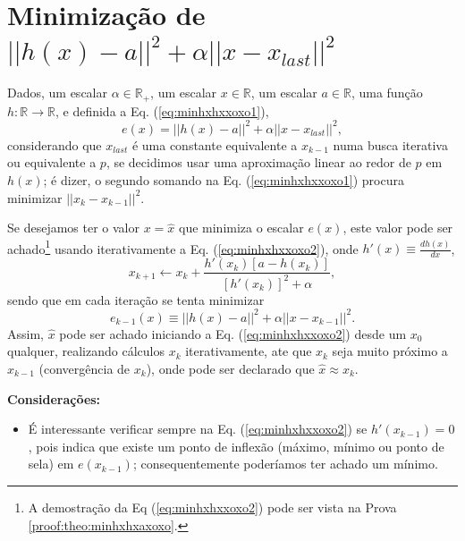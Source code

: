 \section{Minimização de $||h(x)-a||^2+\alpha ||x-x_{last}||^2$}


\begin{theorem}\label{theo:minhxhxxoxo}
Dados,
um escalar $\alpha \in \mathbb{R}_+$, 
um escalar $x \in \mathbb{R}$, 
um escalar $a \in \mathbb{R}$,  
uma função $h:\mathbb{R} \rightarrow \mathbb{R}$, e 
definida a Eq. (\ref{eq:minhxhxxoxo1}),
\begin{equation}\label{eq:minhxhxxoxo1}
e(x)=||h(x)-a||^2+\alpha ||x-x_{last}||^2,
\end{equation}
considerando que $x_{last}$ é uma constante equivalente a $x_{k-1}$
numa busca iterativa ou equivalente a $p$, 
se decidimos usar uma aproximação linear ao redor de $p$ em $h(x)$; 
é dizer, o segundo somando na Eq. (\ref{eq:minhxhxxoxo1}) 
procura minimizar $||x_{k}-x_{k-1}||^2$.

Se desejamos ter o valor $x=\hat{x}$ que minimiza o escalar $e(x)$,
este valor pode ser achado\footnote{A 
demostração da Eq (\ref{eq:minhxhxxoxo2}) pode ser vista na Prova \ref{proof:theo:minhxhxaxoxo}.} 
 usando iterativamente a Eq. (\ref{eq:minhxhxxoxo2}),
onde  $h'(x)\equiv \frac{d h(x)}{d x}$,
\begin{equation}\label{eq:minhxhxxoxo2}
x_{k+1} \leftarrow x_k+
\frac{ h'(x_k) \left[a-h(x_k)\right] }{\left[h'(x_k)\right]^2+\alpha},
\end{equation}
sendo que em cada iteração se tenta minimizar
\begin{equation}\label{eq:minhxhxxoxo2:ex}
e_{k-1}(x)  \equiv ||h(x)-a||^2 + \alpha||x-x_{k-1}||^2.
\end{equation}
Assim, $\hat{x}$ pode ser achado iniciando a Eq. (\ref{eq:minhxhxxoxo2}) desde um 
$x_{0}$ qualquer, realizando cálculos $x_{k}$ iterativamente, 
ate que $x_{k}$ seja muito próximo a $x_{k-1}$ (convergência de $x_{k}$),
onde pode ser declarado que $\hat{x} \approx x_{k}$.

\textbf{Considerações:}
\begin{itemize}
\item É interessante verificar sempre na Eq. (\ref{eq:minhxhxxoxo2}) 
se  $h'(x_{k-1}) = 0$,
pois indica que existe um ponto de inflexão 
(máximo, mínimo ou ponto de sela) em $e(x_{k-1})$;
consequentemente poderíamos ter achado um mínimo.
\end{itemize}

\end{theorem}

